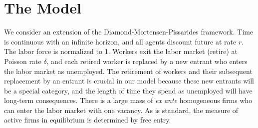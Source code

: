 \documentclass[12pt]{article} %
\theoremstyle{definition}
\begin{document}

\section{The Model}\label{section model}

We consider an extension of the Diamond-Mortensen-Pissarides framework. Time is continuous with an infinite horizon, and all agents discount future at rate $r$. The labor force is normalized to 1. Workers exit the labor market (retire) at Poisson rate $\delta$, and each retired worker is replaced by a new entrant
who enters the labor market as unemployed. The retirement of workers and their subsequent replacement by an entrant is crucial in our model because these new entrants will be a special category, and the length of time they spend as unemployed will have long-term consequences. There is a large mass of \textit{ex ante} homogeneous firms who can enter the labor market with one vacancy. As is standard, the measure of active firms in equilibrium is determined by free entry. 
\end{document}
